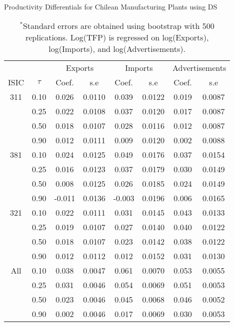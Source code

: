 \documentclass[12pt]{article}
\begin{document}
\begin{appendices}
\begin{table}[H]
\centering
\caption{Productivity Differentials for Chilean Manufacturing Plants using DS}
\small
\begin{tabular}{cccccccc}
  \hline\hline & & \multicolumn{2}{c}{Exports}  & \multicolumn{2}{c}{Imports} & \multicolumn{2}{c}{Advertisements} \\ \cmidrule(lr){3-4} \cmidrule(lr){5-6} \cmidrule(lr){7-8}ISIC & $\tau$ & Coef. & s.e & Coef. & s.e & Coef. & s.e \\ 
  \hline
311 & 0.10 & 0.026 & 0.0110 & 0.039 & 0.0122 & 0.019 & 0.0087 \\ 
   & 0.25 & 0.022 & 0.0108 & 0.037 & 0.0120 & 0.017 & 0.0087 \\ 
   & 0.50 & 0.018 & 0.0107 & 0.028 & 0.0116 & 0.012 & 0.0087 \\ 
   & 0.90 & 0.012 & 0.0111 & 0.009 & 0.0120 & 0.002 & 0.0088 \\ 
  381 & 0.10 & 0.024 & 0.0125 & 0.049 & 0.0176 & 0.037 & 0.0154 \\ 
   & 0.25 & 0.016 & 0.0123 & 0.037 & 0.0179 & 0.030 & 0.0149 \\ 
   & 0.50 & 0.008 & 0.0125 & 0.026 & 0.0185 & 0.024 & 0.0149 \\ 
   & 0.90 & -0.011 & 0.0136 & -0.003 & 0.0196 & 0.006 & 0.0165 \\ 
  321 & 0.10 & 0.022 & 0.0111 & 0.031 & 0.0145 & 0.043 & 0.0133 \\ 
   & 0.25 & 0.019 & 0.0107 & 0.027 & 0.0140 & 0.040 & 0.0122 \\ 
   & 0.50 & 0.018 & 0.0107 & 0.023 & 0.0142 & 0.038 & 0.0122 \\ 
   & 0.90 & 0.012 & 0.0112 & 0.012 & 0.0152 & 0.031 & 0.0130 \\ 
  All & 0.10 & 0.038 & 0.0047 & 0.061 & 0.0070 & 0.053 & 0.0055 \\ 
   & 0.25 & 0.031 & 0.0046 & 0.054 & 0.0069 & 0.051 & 0.0053 \\ 
   & 0.50 & 0.023 & 0.0046 & 0.045 & 0.0068 & 0.046 & 0.0052 \\ 
   & 0.90 & 0.002 & 0.0046 & 0.017 & 0.0069 & 0.030 & 0.0053 \\ 
   \hline
\end{tabular}
\caption*{\footnotesize $^{*}$Standard errors are obtained using bootstrap with 500 replications. Log(TFP) is regressed on log(Exports), log(Imports), and log(Advertisements).}
\label{QLPCHLTFPP}
\end{table}


\end{appendices}
\end{document}
